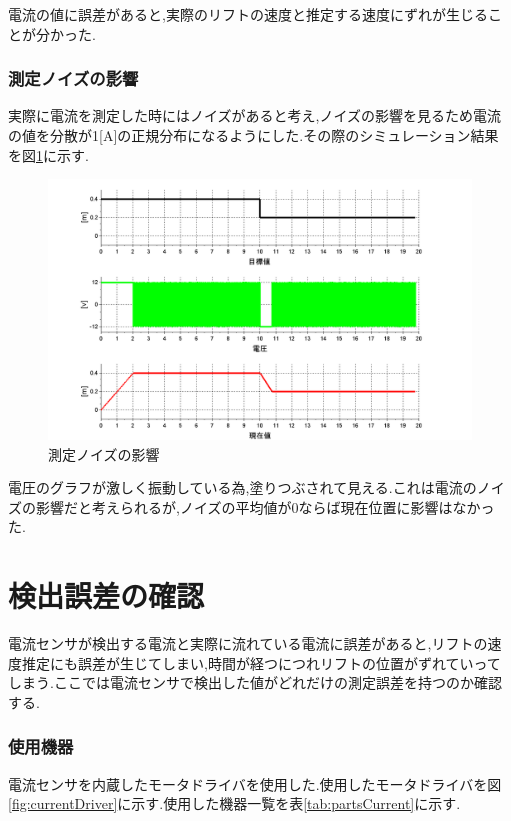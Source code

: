電流の値に誤差があると,実際のリフトの速度と推定する速度にずれが生じることが分かった.

\subsubsection{測定ノイズの影響}
実際に電流を測定した時にはノイズがあると考え,ノイズの影響を見るため電流の値を分散が1[A]の正規分布になるようにした.その際のシミュレーション結果を図\ref{fig:sim2}に示す.

\begin{figure}[htbp]
 \begin{center}
    \includegraphics[width=150mm]{img/sim2.bmp}
    \end{center}
  \caption{測定ノイズの影響}
 \label{fig:sim2}
\end{figure}

電圧のグラフが激しく振動している為,塗りつぶされて見える.これは電流のノイズの影響だと考えられるが,ノイズの平均値が0ならば現在位置に影響はなかった.

\section{検出誤差の確認}
電流センサが検出する電流と実際に流れている電流に誤差があると,リフトの速度推定にも誤差が生じてしまい,時間が経つにつれリフトの位置がずれていってしまう.ここでは電流センサで検出した値がどれだけの測定誤差を持つのか確認する.

\subsubsection{使用機器}
電流センサを内蔵したモータドライバを使用した.使用したモータドライバを図\ref{fig:currentDriver}に示す.使用した機器一覧を表\ref{tab:partsCurrent}に示す.

